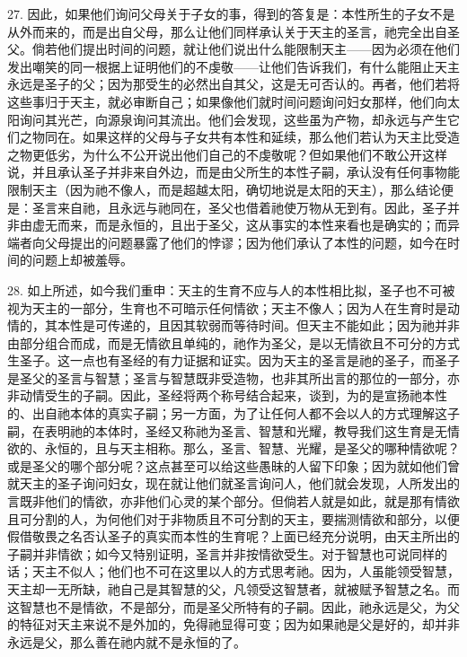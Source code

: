 27. 因此，如果他们询问父母关于子女的事，得到的答复是：本性所生的子女不是从外而来的，而是出自父母，那么让他们同样承认关于天主的圣言，祂完全出自圣父。倘若他们提出时间的问题，就让他们说出什么能限制天主——因为必须在他们发出嘲笑的同一根据上证明他们的不虔敬——让他们告诉我们，有什么能阻止天主永远是圣子的父；因为那受生的必然出自其父，这是无可否认的。再者，他们若将这些事归于天主，就必审断自己；如果像他们就时间问题询问妇女那样，他们向太阳询问其光芒，向源泉询问其流出。他们会发现，这些虽为产物，却永远与产生它们之物同在。如果这样的父母与子女共有本性和延续，那么他们若认为天主比受造之物更低劣，为什么不公开说出他们自己的不虔敬呢？但如果他们不敢公开这样说，并且承认圣子并非来自外边，而是由父所生的本性子嗣，承认没有任何事物能限制天主（因为祂不像人，而是超越太阳，确切地说是太阳的天主），那么结论便是：圣言来自祂，且永远与祂同在，圣父也借着祂使万物从无到有。因此，圣子并非由虚无而来，而是永恒的，且出于圣父，这从事实的本性来看也是确实的；而异端者向父母提出的问题暴露了他们的悖谬；因为他们承认了本性的问题，如今在时间的问题上却被羞辱。\par

28. 如上所述，如今我们重申：天主的生育不应与人的本性相比拟，圣子也不可被视为天主的一部分，生育也不可暗示任何情欲；天主不像人；因为人在生育时是动情的，其本性是可传递的，且因其软弱而等待时间。但天主不能如此；因为祂并非由部分组合而成，而是无情欲且单纯的，祂作为圣父，是以无情欲且不可分的方式生圣子。这一点也有圣经的有力证据和证实。因为天主的圣言是祂的圣子，而圣子是圣父的圣言与智慧；圣言与智慧既非受造物，也非其所出言的那位的一部分，亦非动情受生的子嗣。因此，圣经将两个称号结合起来，谈到，为的是宣扬祂本性的、出自祂本体的真实子嗣；另一方面，为了让任何人都不会以人的方式理解这子嗣，在表明祂的本体时，圣经又称祂为圣言、智慧和光耀，教导我们这生育是无情欲的、永恒的，且与天主相称。那么，圣言、智慧、光耀，是圣父的哪种情欲呢？或是圣父的哪个部分呢？这点甚至可以给这些愚昧的人留下印象；因为就如他们曾就天主的圣子询问妇女，现在就让他们就圣言询问人，他们就会发现，人所发出的言既非他们的情欲，亦非他们心灵的某个部分。但倘若人就是如此，就是那有情欲且可分割的人，为何他们对于非物质且不可分割的天主，要揣测情欲和部分，以便假借敬畏之名否认圣子的真实而本性的生育呢？上面已经充分说明，由天主所出的子嗣并非情欲；如今又特别证明，圣言并非按情欲受生。对于智慧也可说同样的话；天主不似人；他们也不可在这里以人的方式思考祂。因为，人虽能领受智慧，天主却一无所缺，祂自己是其智慧的父，凡领受这智慧者，就被赋予智慧之名。而这智慧也不是情欲，不是部分，而是圣父所特有的子嗣。因此，祂永远是父，为父的特征对天主来说不是外加的，免得祂显得可变；因为如果祂是父是好的，却并非永远是父，那么善在祂内就不是永恒的了。\par

